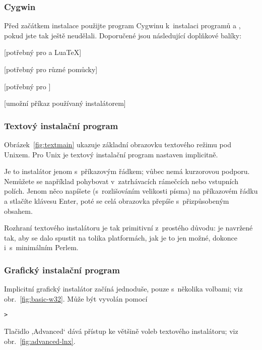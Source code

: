 \documentclass[\classoptions,slovak,english,czech]{\classname}
\newcommand{\singleuv}[1]{,#1`}
\begin{document}
\subsubsection{Cygwin}
\label{sec:cygwin}

Před začátkem instalace použijte program Cygwinu 
 k~instalaci programů 
 a , pokud jste tak ještě neudělali.
Doporučené jsou následující doplňkové balíky:
\begin{itemize*}
\item {} [potřebný pro \XeTeX a Lua\TeX]
\item {} [potřebný pro různé pomůcky]
\item {} [potřebný pro ]
\item {} [umožní příkaz 
       používaný instalátorem]
\end{itemize*}

\subsubsection{Textový instalační program}

Obrázek~\ref{fig:textmain} ukazuje základní obrazovku textového režimu pod Unixem.
Pro Unix je textový instalační program nastaven implicitně.

Je to instalátor jenom s~příkazovým řádkem; vůbec nemá kurzorovou podporu.
Nemůžete se například pohybovat v~zatrhávacích rámečcích nebo vstupních polích. 
Jenom něco napíšete (s~rozlišováním velikosti písma) na příkazovém řádku a 
stlačíte klávesu Enter, poté se celá obrazovka přepíše s~přizpůsobeným obsahem.

Rozhraní textového instalátoru je tak primitivní z~prostého důvodu: je
navržené tak, aby se dalo spustit na tolika platformách, jak je to jen
možné, dokonce i~s~minimálním Perlem.

\subsubsection{Grafický instalační program}
\label{sec:graphical-inst}

Implicitní grafický instalátor začíná jednoduše, pouze s~několika
volbami; viz obr.~\ref{fig:basic-w32}.
Může být vyvolán pomocí
\begin{alltt}
	> 
\end{alltt}
Tlačidlo \singleuv{Advanced} dává přístup ke většině voleb textového
instalátoru; viz obr.~\ref{fig:advanced-lnx}.
\end{document}

